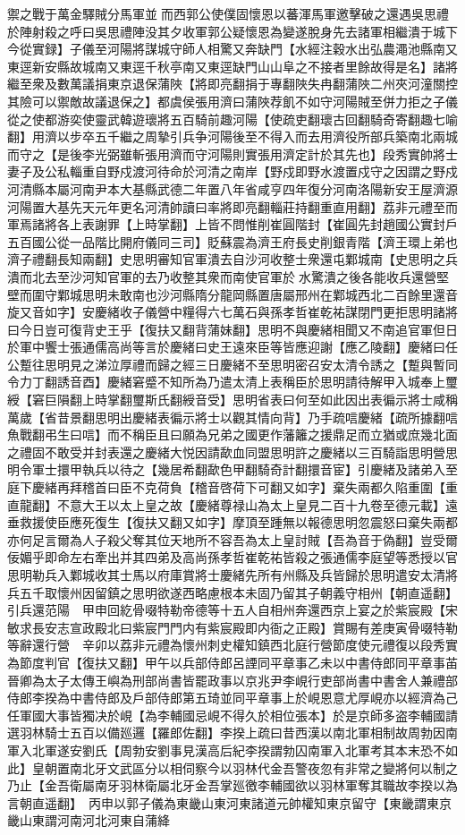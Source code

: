 禦之戰于萬金驛賊分馬軍並而西郭公使僕固懷恩以蕃渾馬軍邀擊破之還遇吳思禮於陣射殺之呼曰吳思禮陣没其夕收軍郭公疑懷恩為變遂脫身先去諸軍相繼潰于城下今從實録】子儀至河陽將謀城守師人相驚又奔缺門【水經注穀水出弘農澠池縣南又東逕新安縣故城南又東逕千秋亭南又東逕缺門山山阜之不接者里餘故得是名】諸將繼至衆及數萬議捐東京退保蒲陜【將即亮翻捐于專翻陜失冉翻蒲陜二州夾河潼關控其險可以禦敵故議退保之】都虞侯張用濟曰蒲陜荐飢不如守河陽賊至併力拒之子儀從之使都游奕使靈武韓遊瓌將五百騎前趣河陽【使疏吏翻瓌古回翻騎奇寄翻趣七喻翻】用濟以步卒五千繼之周摯引兵争河陽後至不得入而去用濟役所部兵築南北兩城而守之【是後李光弼雖斬張用濟而守河陽則實張用濟定計於其先也】段秀實帥將士妻子及公私輜重自野戍渡河待命於河清之南岸【野戍即野水渡置戍守之因謂之野戍河清縣本屬河南尹本大基縣武德二年置八年省咸亨四年復分河南洛陽新安王屋濟源河陽置大基先天元年更名河清帥讀曰率將即亮翻輜莊持翻重直用翻】荔非元禮至而軍焉諸將各上表謝罪【上時掌翻】上皆不問惟削崔圓階封【崔圓先封趙國公實封戶五百國公從一品階比開府儀同三司】貶蘇震為濟王府長史削銀青階【濟王環上弟也濟子禮翻長知兩翻】史思明審知官軍潰去自沙河收整士衆還屯鄴城南【史思明之兵潰而北去至沙河知官軍的去乃收整其衆而南使官軍於水驚潰之後各能收兵還營堅壁而圍守鄴城思明未敢南也沙河縣隋分龍岡縣置唐屬邢州在鄴城西北二百餘里還音旋又音如字】安慶緒收子儀營中糧得六七萬石與孫孝哲崔乾祐謀閉門更拒思明諸將曰今日豈可復背史王乎【復扶又翻背蒲妹翻】思明不與慶緒相聞又不南追官軍但日於軍中饗士張通儒高尚等言於慶緒曰史王遠來臣等皆應迎謝【應乙陵翻】慶緒曰任公蹔往思明見之涕泣厚禮而歸之經三日慶緒不至思明密召安太清令誘之【蹔與暫同令力丁翻誘音酉】慶緒窘蹙不知所為乃遣太清上表稱臣於思明請待解甲入城奉上璽綬【窘巨隕翻上時掌翻璽斯氏翻綬音受】思明省表曰何至如此因出表徧示將士咸稱萬歲【省昔景翻思明出慶緒表徧示將士以觀其情向背】乃手疏唁慶緒【疏所據翻唁魚戰翻弔生曰唁】而不稱臣且曰願為兄弟之國更作藩籬之援鼎足而立猶或庶幾北面之禮固不敢受并封表還之慶緒大悦因請歃血同盟思明許之慶緒以三百騎詣思明營思明令軍士擐甲執兵以待之【幾居希翻歃色甲翻騎奇計翻擐音宦】引慶緒及諸弟入至庭下慶緒再拜稽首曰臣不克荷負【稽音啓荷下可翻又如字】棄失兩都久陷重圍【重直龍翻】不意大王以太上皇之故【慶緒尊禄山為太上皇見二百十九卷至德元載】遠垂救援使臣應死復生【復扶又翻又如字】摩頂至踵無以報德思明忽震怒曰棄失兩都亦何足言爾為人子殺父奪其位天地所不容吾為太上皇討賊【吾為音于偽翻】豈受爾佞媚乎即命左右牽出并其四弟及高尚孫孝哲崔乾祐皆殺之張通儒李庭望等悉授以官思明勒兵入鄴城收其士馬以府庫賞將士慶緒先所有州縣及兵皆歸於思明遣安太清將兵五千取懷州因留鎮之思明欲遂西略慮根本未固乃留其子朝義守相州【朝直遥翻】引兵還范陽　甲申回紇骨啜特勒帝德等十五人自相州奔還西京上宴之於紫宸殿【宋敏求長安志宣政殿北曰紫宸門門内有紫宸殿即内衙之正殿】賞賜有差庚寅骨啜特勒等辭還行營　辛卯以荔非元禮為懷州刺史權知鎮西北庭行營節度使元禮復以段秀實為節度判官【復扶又翻】甲午以兵部侍郎呂諲同平章事乙未以中書侍郎同平章事苖晉卿為太子太傳王嶼為刑部尚書皆罷政事以京兆尹李峴行吏部尚書中書舍人兼禮部侍郎李揆為中書侍郎及戶部侍郎第五琦並同平章事上於峴恩意尤厚峴亦以經濟為己任軍國大事皆獨决於峴【為李輔國忌峴不得久於相位張本】於是京師多盗李輔國請選羽林騎士五百以備廵邏【羅郎佐翻】李揆上疏曰昔西漢以南北軍相制故周勃因南軍入北軍遂安劉氏【周勃安劉事見漢高后紀李揆謂勃囚南軍入北軍考其本末恐不如此】皇朝置南北牙文武區分以相伺察今以羽林代金吾警夜忽有非常之變將何以制之乃止【金吾衛屬南牙羽林衛屬北牙金吾掌廵徼李輔國欲以羽林軍奪其職故李揆以為言朝直遥翻】　丙申以郭子儀為東畿山東河東諸道元帥權知東京留守【東畿謂東京畿山東謂河南河北河東自蒲絳
